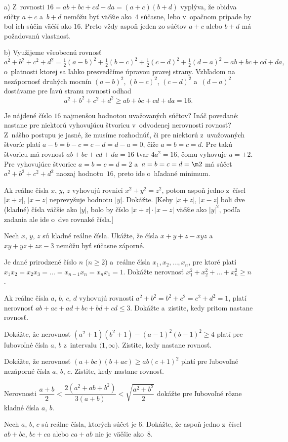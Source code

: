 {%
a) Z~rovnosti $16=ab+bc+cd+da=(a+c)(b+d)$ vyplýva, že
obidva súčty $a+c$ a~$b+d$ nemôžu byť väčšie ako~$4$ súčasne,
lebo v~opačnom prípade by bol ich súčin väčší ako $16$.
Preto vždy aspoň jeden zo súčtov $a+c$ alebo $b+d$
má požadovanú vlastnosť.

\smallskip
b) Využijeme všeobecnú rovnosť
$$
a^2+b^2+c^2+d^2=\tfrac12(a-b)^2+\tfrac12(b-c)^2+
\tfrac12(c-d)^2+\tfrac12(d-a)^2+ab+bc+cd+da,
$$
o~platnosti ktorej sa ľahko presvedčíme úpravou pravej strany.
Vzhľadom na nezápornosť
druhých mocnín $(a-b)^2$, $(b-c)^2$, $(c-d)^2$ a~$(d-a)^2$
dostávame pre ľavú stranu rovnosti odhad
$$
a^2+b^2+c^2+d^2\ge ab+bc+cd+da=16.
$$

Je nájdené číslo $16$ najmenšou hodnotou uvažovaných
súčtov? Ináč povedané: nastane pre niektorú vyhovujúcu štvoricu
v~odvodenej nerovnosti rovnosť?  Z~nášho postupu je jasné, že
musíme rozhodnúť, či pre niektorú z~uvažovaných štvoríc
platí $a-b=b-c=c-d=d-a=0$, čiže
$a=b=c=d$. Pre takú štvoricu má rovnosť $ab+bc+cd+da=16$
tvar $4a^2=16$, čomu vyhovuje $a=\pm2$. Pre
vyhovujúce štvorice $a=b=c=d=2$ a~$a=b=c=d=\m2$ má súčet
$a^2+b^2+c^2+d^2$ naozaj hodnotu~$16$, preto ide o~hľadané
minimum.

Ak reálne čísla $x$, $y$, $z$ vyhovujú rovnici
$x^2+y^2=z^2$, potom aspoň jedno z~čísel $|x+z|$, $|x-z|$
neprevyšuje hodnotu $|y|$. Dokážte. [Keby
$|x+z|$, $|x-z|$ boli dve (kladné) čísla väčšie ako $|y|$,
bolo by číslo $|x+z|\cdot|x-z|$ väčšie ako $|y|^2$,
podľa zadania ale ide o~dve rovnaké čísla.]

Nech $x$, $y$, $z$ sú kladné reálne čísla. Ukážte,
že čísla $x+y+z-xyz$ a~${xy+yz+zx-3}$ nemôžu byť súčasne záporné.
\vpravo{[60--C-II--4]}

Je dané prirodzené číslo $n$ ($n\ge2$) a~reálne čísla
$x_1,x_2,\dots,x_n$, pre ktoré platí
$x_1x_2=x_2x_3=\dots=x_{n-1}x_n=x_nx_1=1$.
Dokážte nerovnosť
$x_1^2+x_2^2+\dots+x_n^2\ge n$.
\vpravo{[55--C--I--4]}

Ak reálne čísla  $a$, $b$, $c$, $d$ vyhovujú rovnosti
$a^{2}+b^{2}=b^{2}+c^{2}=c^{2}+d^{2}=1$,
platí nerovnosť
$ab+ac+ad+bc+bd+cd\le3$.
Dokážte a~zistite, kedy pritom nastane rovnosť.
\vpravo{[55--C--II--2]}

Dokážte, že nerovnosť $(a^2+1)(b^2+1) - (a-1)^2
(b-1)^2\ge4$ platí pre ľubovoľné čísla $a$, $b$ z~intervalu
$\langle1,\infty)$. Zistite, kedy nastane rovnosť.
\vpravo{[59--C--II--2]}

Dokážte, že nerovnosť $(a+bc)(b+ac)\ge ab(c+1)^2$
platí pre ľubovoľné nezáporné čísla $a$, $b$, $c$.
Zistite, kedy nastane rovnosť.
\vpravo{[58--C--S--1]}

Nerovnosti
$\dfrac{a+b}{2}<\dfrac{2(a^2+ab+b^2)}{3(a+b)}<\sqrt{\dfrac{a^2+b^2}{2}}$
dokážte pre ľubovoľné rôzne kladné čísla $a$, $b$.
\vpravo{[58--C--I--6]}

Nech $a$, $b$, $c$ sú reálne čísla, ktorých súčet je $6$.
Dokážte, že aspoň jedno z~čísel $ab+bc$, $bc+ca$ alebo $ca+ab$
nie je väčšie ako~$8$.
\vpravo{[60--B--I--3]}
}

